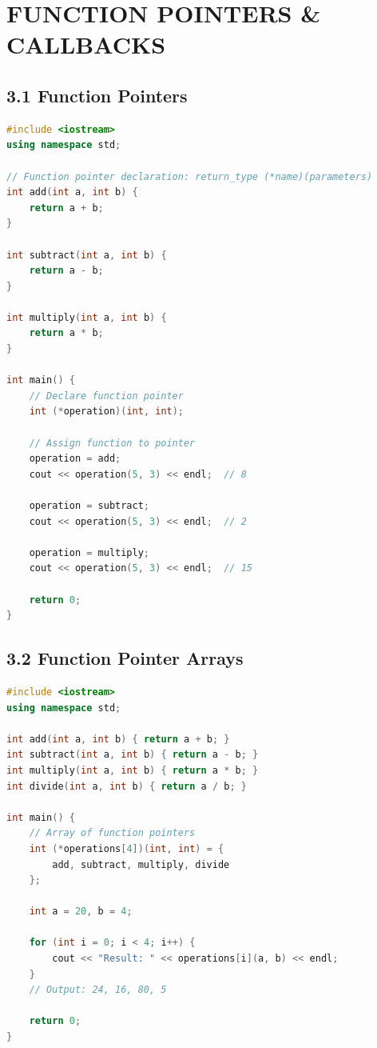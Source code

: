 \hypertarget{function-pointers-callbacks}{%
\chapter{FUNCTION POINTERS \&
CALLBACKS}\label{function-pointers-callbacks}}

\hypertarget{function-pointers}{%
\section{3.1 Function Pointers}\label{function-pointers}}

\begin{lstlisting}[language={C++}]
#include <iostream>
using namespace std;

// Function pointer declaration: return_type (*name)(parameters)
int add(int a, int b) {
    return a + b;
}

int subtract(int a, int b) {
    return a - b;
}

int multiply(int a, int b) {
    return a * b;
}

int main() {
    // Declare function pointer
    int (*operation)(int, int);
    
    // Assign function to pointer
    operation = add;
    cout << operation(5, 3) << endl;  // 8
    
    operation = subtract;
    cout << operation(5, 3) << endl;  // 2
    
    operation = multiply;
    cout << operation(5, 3) << endl;  // 15
    
    return 0;
}
\end{lstlisting}

\hypertarget{function-pointer-arrays}{%
\section{3.2 Function Pointer Arrays}\label{function-pointer-arrays}}

\begin{lstlisting}[language={C++}]
#include <iostream>
using namespace std;

int add(int a, int b) { return a + b; }
int subtract(int a, int b) { return a - b; }
int multiply(int a, int b) { return a * b; }
int divide(int a, int b) { return a / b; }

int main() {
    // Array of function pointers
    int (*operations[4])(int, int) = {
        add, subtract, multiply, divide
    };
    
    int a = 20, b = 4;
    
    for (int i = 0; i < 4; i++) {
        cout << "Result: " << operations[i](a, b) << endl;
    }
    // Output: 24, 16, 80, 5
    
    return 0;
}
\end{lstlisting}

